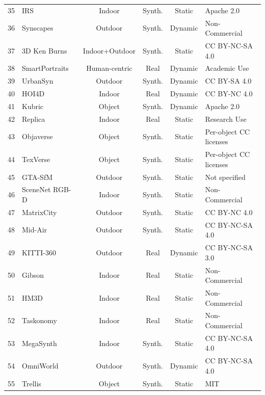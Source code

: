 \begin{table}[h]
\begin{tabularx}{\textwidth}{@{}c >{\centering\arraybackslash}X c c c >{\centering\arraybackslash}X@{}}
35 & IRS~\cite{wang2021irs} & Indoor & Synth. & Static & Apache 2.0 \\
36 & Synscapes~\cite{wrenninge2018synscapes} & Outdoor & Synth. & Dynamic & Non-Commercial \\
37 & 3D Ken Burns~\cite{niklaus2019kenburns} & Indoor+Outdoor & Synth. & Static & CC BY-NC-SA 4.0 \\
38 & SmartPortraits~\cite{kornilova2022smartportraits} & Human-centric & Real & Dynamic & Academic Use \\
39 & UrbanSyn~\cite{gomez2025urbansyn} & Outdoor & Synth. & Dynamic & CC BY-SA 4.0 \\
40 & HOI4D~\cite{liu2022hoi4d} & Indoor & Real & Dynamic & CC BY-NC 4.0 \\
41 & Kubric~\cite{greff2022kubric} & Object & Synth. & Dynamic & Apache 2.0 \\
42 & Replica~\cite{straub2019replica} & Indoor & Real & Static & Research Use \\
43 & Objaverse~\cite{deitke2023objaverse} & Object & Synth. & Static & Per-object CC licenses \\
44 & TexVerse~\cite{zhang2025texverse} & Object & Synth. & Static & Per-object CC licenses \\
45 & GTA-SfM~\cite{wang2020flow} & Outdoor & Synth. & Static & Not specified \\
46 & SceneNet RGB-D~\cite{mccormac2016scenenet} & Indoor & Synth. & Static & Non-Commercial \\
47 & MatrixCity~\cite{li2023matrixcity} & Outdoor & Synth. & Static & CC BY-NC 4.0 \\
48 & Mid-Air~\cite{fonder2019midair} & Outdoor & Synth. & Static & CC BY-NC-SA 4.0 \\
49 & KITTI-360~\cite{liao2021kitti360} & Outdoor & Real & Dynamic & CC BY-NC-SA 3.0 \\
50 & Gibson~\cite{xia2018gibson} & Indoor & Real & Static & Non-Commercial \\
51 & HM3D~\cite{ramakrishnan2021hm3d} & Indoor & Real & Static & Non-Commercial \\
52 & Taskonomy~\cite{zamir2018taskonomy} & Indoor & Real & Static & Non-Commercial \\
53 & MegaSynth~\cite{jiang2025megasynth} & Indoor & Synth. & Static & CC BY-NC-SA 4.0 \\
54 & OmniWorld~\cite{zhou2025omniworld} & Outdoor & Synth. & Dynamic & CC BY-NC-SA 4.0 \\
55 & Trellis~\cite{xiang2025structured} & Object & Synth. & Static & MIT \\

\end{tabularx}
\end{table}
